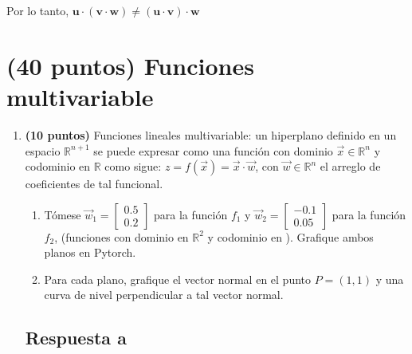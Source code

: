 \documentclass[12 pt]{article}
\begin{document}
\begin{center}
Por lo tanto, \(\mathbf{u} \cdot (\mathbf{v} \cdot \mathbf{w}) \neq (\mathbf{u} \cdot \mathbf{v}) \cdot \mathbf{w}\)\\
\end{center}

\section{(40 puntos) Funciones multivariable}
\begin{enumerate}
\item \textbf{(10 puntos)} Funciones lineales multivariable: un hiperplano
definido en un espacio $\mathbb{R}^{n+1}$ se puede expresar como
una función con dominio $\vec{x}\in\mathbb{R}^{n}$ y codominio en
$\mathbb{R}$ como sigue: $z=f\left(\vec{x}\right)=\vec{x}\cdot\vec{w}$,
con $\vec{w}\in\mathbb{R}^{n}$ el arreglo de coeficientes de tal
funcional.
\begin{enumerate}
\item Tómese $\vec{w}_{1}=\begin{bmatrix}0.5\\
0.2
\end{bmatrix}$ para la función $f_{1}$ y $\vec{w}_{2}=\begin{bmatrix}-0.1\\
0.05
\end{bmatrix}$ para la función $f_{2}$, (funciones con dominio en $\mathbb{R}^{2}$
y codominio en ). Grafique ambos planos en Pytorch. 
\item Para cada plano, grafique el vector normal en el punto $P=\left(1,1\right)$
y una curva de nivel perpendicular a tal vector normal. 
\end{enumerate}
\subsection{Respuesta a}


\end{enumerate}
\end{document}
